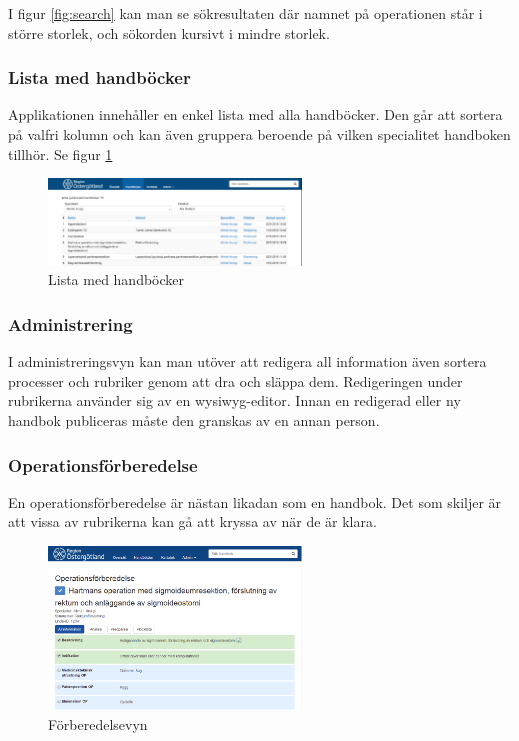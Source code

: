 I figur \ref{fig:search} kan man se sökresultaten där namnet på operationen står i större storlek, och sökorden kursivt i mindre storlek.

\subsubsection{Lista med handböcker}
Applikationen innehåller en enkel lista med alla handböcker.
Den går att sortera på valfri kolumn och kan även gruppera beroende på vilken specialitet handboken tillhör.
Se figur \ref{fig:list}

\begin{figure}
  \centering
  \includegraphics[width=0.6\textwidth]{images/site/list}
  \caption{Lista med handböcker}
  \label{fig:list}
\end{figure}

\subsubsection{Administrering}
I administreringsvyn kan man utöver att redigera all information även sortera processer och rubriker genom att dra och släppa dem.
Redigeringen under rubrikerna använder sig av en wysiwyg-editor.
Innan en redigerad eller ny handbok publiceras måste den granskas av en annan person.

\subsubsection{Operationsförberedelse}
En operationsförberedelse är nästan likadan som en handbok.
Det som skiljer är att vissa av rubrikerna kan gå att kryssa av när de är klara.

\begin{figure}
  \centering
  \includegraphics[width=0.6\textwidth]{images/site/op}
  \caption{Förberedelsevyn}
  \label{fig:op}
\end{figure}


